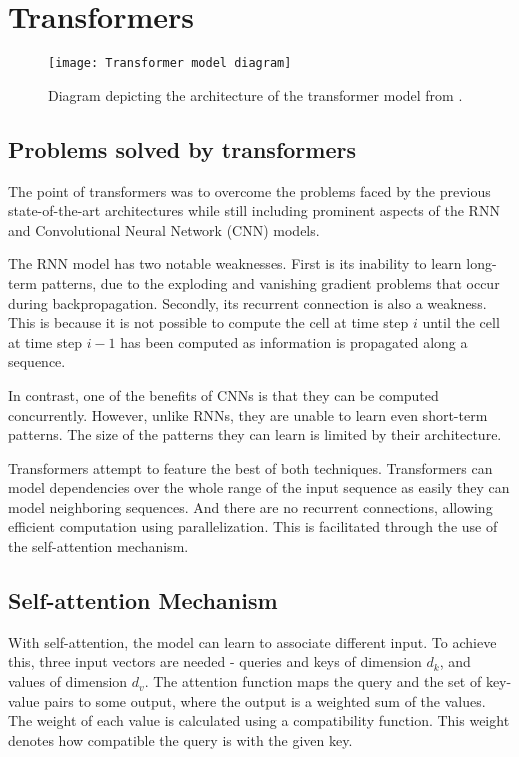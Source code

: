 \section{Transformers}
\begin{figure}[h]
\centering
\texttt{[image: Transformer model diagram]}
\caption{Diagram depicting the architecture of the transformer model from \citet{AttentionIsAllYouNeed}.}
\label{fig:original transformer}
\end{figure}
\subsection{Problems solved by transformers}
The point of transformers was to overcome the problems faced by the previous state-of-the-art architectures while still including prominent aspects of the RNN and Convolutional Neural Network (CNN) models.

The RNN model has two notable weaknesses. First is its inability to learn long-term patterns, due to the exploding and vanishing gradient problems that occur during backpropagation.
Secondly, its recurrent connection is also a weakness. This is because it is not possible to compute the cell at time step $i$ until the cell at time step $i-1$ has been computed as information is propagated along a sequence.

In contrast, one of the benefits of CNNs is that they can be computed concurrently. However, unlike RNNs, they are unable to learn even short-term patterns. The size of the patterns they can learn is limited by their architecture.

Transformers attempt to feature the best of both techniques.
Transformers can model dependencies over the whole range of the input sequence as easily they can model neighboring sequences. And there are no recurrent connections, allowing efficient computation using parallelization. This is facilitated through the use of the self-attention mechanism.\cite{TransformersScratchPeterbloem}

 
\subsection{Self-attention Mechanism}


With self-attention, the model can learn to associate different input.
To achieve this, three input vectors are needed - queries and keys of dimension $d_k$, and values of dimension $d_v$.
The attention function maps the query and the set of key-value pairs to some output, where the output is a weighted sum of the values.
The weight of each value is calculated using a compatibility function.
This weight denotes how compatible the query is with the given key.



